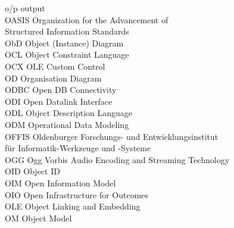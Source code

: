 \begin{tabbing}


    \>o/p \>\>output\\

    \>OASIS \>\>Organization for the Advancement of\\
        \>\>\>Structured Information Standards\\

    \>ObD \>\>Object (Instance) Diagram\\

    \>OCL \>\>Object Constraint Language\\

    \>OCX \>\>OLE Custom Control\\

    \>OD \>\>Organisation Diagram\\

    \>ODBC \>\>Open DB Connectivity\\

    \>ODI \>\>Open Datalink Interface\\

    \>ODL \>\>Object Description Language\\

    \>ODM \>\>Operational Data Modeling\\


    \>OFFIS \>\>Oldenburger Forschungs- und Entwicklungsinstitut\\
        \>\>\>f\"{u}r Informatik-Werkzeuge und -Systeme\\

    \>OGG \>\>Ogg Vorbis Audio Encoding and Streaming Technology\\

    \>OID \>\>Object ID\\

    \>OIM \>\>Open Information Model\\

    \>OIO \>\>Open Infrastructure for Outcomes\\

    \>OLE \>\>Object Linking and Embedding\\

    \>OM \>\>Object Model\\


\end{tabbing}
